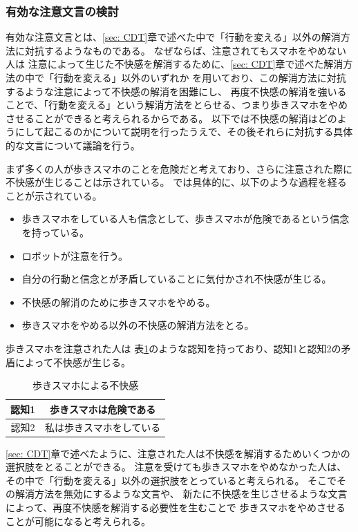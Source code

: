 \documentclass{kuisthesis}
\begin{document}
\subsubsection{有効な注意文言の検討}
\label{sec: effective}
有効な注意文言とは、\ref{sec: CDT}章で述べた中で「行動を変える」以外の解消方法に対抗するようなものである。
なぜならば、注意されてもスマホをやめない人は
注意によって生じた不快感を解消するために、\ref{sec: CDT}章で述べた解消方法の中で「行動を変える」以外のいずれか
を用いており、この解消方法に対抗するような注意によって不快感の解消を困難にし、
再度不快感の解消を強いることで、「行動を変える」という解消方法をとらせる、つまり歩きスマホをやめさせることができると考えられるからである。
以下では不快感の解消はどのようにして起こるのかについて説明を行ったうえで、その後それらに対抗する具体的な文言について議論を行う。

まず多くの人が歩きスマホのことを危険だと考えており、さらに注意された際に不快感が生じることは示されている。
\cite{Schneider2022}では具体的に、以下のような過程を経ることが示されている。
\begin{itemize}
  \item[(1)] 歩きスマホをしている人も信念として、歩きスマホが危険であるという信念を持っている。
  \item[(2)] ロボットが注意を行う。
  \item[(3)] 自分の行動と信念とが矛盾していることに気付かされ不快感が生じる。
  \item[(4)] 不快感の解消のために歩きスマホをやめる。
  \item[(4')]歩きスマホをやめる以外の不快感の解消方法をとる。
  \label{item: dissonance}
\end{itemize}

歩きスマホを注意された人は
表\ref{fig: UsingPhone}のような認知を持っており、認知1と認知2の矛盾によって不快感が生じる。
\begin{table}[h]
  \centering
  \caption{歩きスマホによる不快感}
  \label{fig: UsingPhone}
  \begin{tabular}{c|c}

      認知1 & 歩きスマホは危険である  \\ \hline
      認知2 & 私は歩きスマホをしている \\ 
  \end{tabular}
\end{table}
\ref{sec: CDT}章で述べたように、注意された人は不快感を解消するためいくつかの選択肢をとることができる。
注意を受けても歩きスマホをやめなかった人は、
その中で「行動を変える」以外の選択肢をとっていると考えられる。
そこでその解消方法を無効にするような文言や、
新たに不快感を生じさせるような文言によって、再度不快感を解消する必要性を生むことで
歩きスマホをやめさせることが可能になると考えられる。
\end{document}
